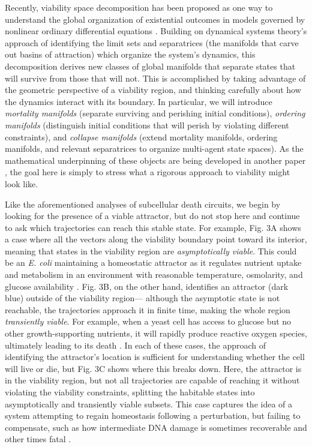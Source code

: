 \documentclass{article}
\begin{document}
Recently, viability space decomposition has been proposed as one way to understand the global organization of existential outcomes in models governed by nonlinear ordinary differential equations \cite{mcshaffrey_decomposing_2023, mcshaffrey_dissecting_2024}. Building on dynamical systems theory’s approach of identifying the limit sets and separatrices (the manifolds that carve out basins of attraction) which organize the system’s dynamics, this decomposition derives new classes of global manifolds that separate states that will survive from those that will not. This is accomplished by taking advantage of the geometric perspective of a viability region, and thinking carefully about how the dynamics interact with its boundary. In particular, we will introduce \textit{mortality manifolds} (separate surviving and perishing initial conditions), \textit{ordering manifolds} (distinguish initial conditions that will perish by violating different constraints), and \textit{collapse manifolds} (extend mortality manifolds, ordering manifolds, and relevant separatrices to organize multi-agent state spaces). As the mathematical underpinning of these objects are being developed in another paper \cite{mcshaffrey_viability_nodate}, the goal here is simply to stress what a rigorous approach to viability might look like.  

Like the aforementioned analyses of subcellular death circuits, we begin by looking for the presence of a viable attractor, but do not stop here and continue to ask which trajectories can reach this stable state. For example, Fig. 3A shows a case where all the vectors along the viability boundary point toward its interior, meaning that states in the viability region are \textit{asymptotically viable}. This could be an \textit{E. coli }maintaining a homeostatic attractor as it regulates nutrient uptake and metabolism in an environment with reasonable temperature, osmolarity, and glucose availability \cite{kochanowski_global_2021}. Fig. 3B, on the other hand, identifies an attractor (dark blue) outside of the viability region— although the asymptotic state is not reachable, the trajectories approach it in finite time, making the whole region \textit{transiently viable}. For example, when a yeast cell has access to glucose but no other growth-supporting nutrients, it will rapidly produce reactive oxygen species, ultimately leading to its death \cite{granot_sugar-induced_2003}. In each of these cases, the approach of identifying the attractor’s location is sufficient for understanding whether the cell will live or die, but Fig. 3C shows where this breaks down. Here, the attractor is in the viability region, but not all trajectories are capable of reaching it without violating the viability constraints, splitting the habitable states into asymptotically and transiently viable subsets. This case captures the idea of a system attempting to regain homeostasis following a perturbation, but failing to compensate, such as how intermediate DNA damage is sometimes recoverable and other times fatal \cite{ciccia_dna_2010}. 
\end{document}

